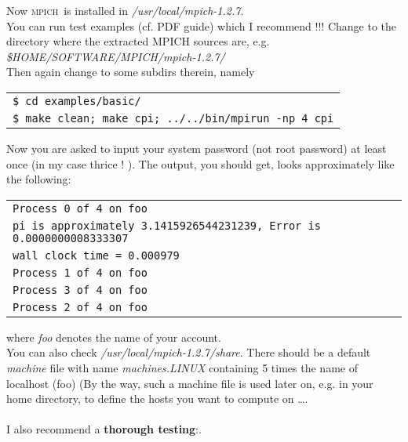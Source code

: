 \documentclass[a4paper,12pt]{article}
\newcommand{\mpich}{\textsc{mpich}\ }
\begin{document}
\begin{enumerate}
\begin{enumerate}
 Now \mpich is installed in \textit{/usr/local/mpich-1.2.7}.\\ You can run test
  examples (cf. PDF guide) which I recommend !!! Change to the directory where
  the extracted \textsc{MPICH} sources are,
  e.g. \\ \textit{\$HOME/SOFTWARE/MPICH/mpich-1.2.7/}\\ Then again change to some
  subdirs therein, namely
  \begin{center}
    \begin{tabular}{l}
      \texttt{\$ cd examples/basic/}\\
      \texttt{\$ make clean; make cpi; ../../bin/mpirun -np 4 cpi} 
    \end{tabular}
  \end{center}
 Now you are asked to input your system password (not root password) at least
 once (in my case thrice ! \smiley). The output, you should get, looks approximately
 like the following:
\begin{center}
    \begin{tabular}{l}
      \texttt{Process 0 of 4 on foo} \\
\texttt{pi is approximately 3.1415926544231239, Error is 0.0000000008333307}\\
\texttt{wall clock time = 0.000979}\\
\texttt{Process 1 of 4 on foo}\\
\texttt{Process 3 of 4 on foo}\\
\texttt{Process 2 of 4 on foo}
\end{tabular}
  \end{center}
where \textit{foo} denotes the name of your account.\\
You can also check \textit{/usr/local/mpich-1.2.7/share}. There should be a
default \textit{machine} file with name \textit{machines.LINUX} containing 5 times the name of
localhost (foo) (By the way, such a machine file is used later on, e.g. in
your home directory, to define
the hosts you want to compute on \ldots.\\ \\
I also recommend a \textbf{thorough testing}:. \\ 


\end{enumerate}
\end{enumerate}
\end{document}
